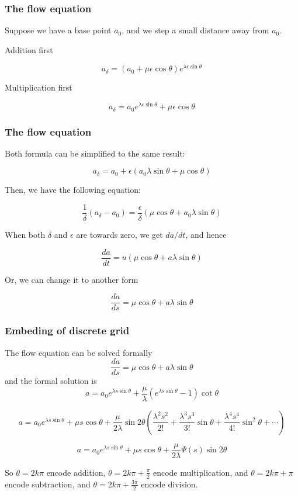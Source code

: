 \documentclass[aspectratio=169]{beamer}
\begin{document}
\begin{frame}
    \frametitle{The flow equation}

    Suppose we have a base point $a_0$, and we step a small distance away from $a_0$.

    Addition first

    \[
        a_{\delta} = (a_0 + \mu \epsilon \cos \theta)e^{\lambda \epsilon \sin \theta}
    \]

    Multiplication first

    \[
        a_{\delta} = a_0 e^{\lambda \epsilon \sin \theta} + \mu \epsilon \cos \theta
    \]

\end{frame}

\begin{frame}
    \frametitle{The flow equation}

    Both formula can be simplified to the same result:

    \[
        a_{\delta} = a_0 + \epsilon (a_0 \lambda \sin \theta + \mu \cos \theta)
    \]

    Then, we have the following equation:

    \[
        \frac{1}{\delta} (a_{\delta} - a_0) = \frac{\epsilon}{\delta} (\mu \cos \theta + a_0 \lambda \sin \theta)
    \]

    When both $\delta$ and $\epsilon$ are towards zero, we get $da / dt$, and hence

    \[
        \frac{da}{dt} = u (\mu \cos \theta + a \lambda \sin \theta)
    \]

    Or, we can change it to another form

    \begin{equation}
        \frac{da}{ds} = \mu \cos \theta + a \lambda \sin \theta\label{eq:flow}
    \end{equation}

\end{frame}

\begin{frame}
    \frametitle{Embeding of discrete grid}
    The flow equation can be solved formally
    \[
        \frac{da}{ds} = \mu \cos \theta + a \lambda \sin \theta
    \]
    and the formal solution is
    \begin{equation}\label{eq:directformalsolution}
    a =  a_0 e^{\lambda s \sin \theta} + \frac{\mu}{\lambda} (e^{\lambda s \sin \theta} - 1) \cot \theta
    \end{equation}

    \[
        a = a_0 e^{\lambda s \sin \theta} + \mu s \cos \theta + \frac{\mu}{2\lambda} \sin 2\theta (\frac{\lambda^2s^2}{2!} + \frac{\lambda^3s^3}{3!} \sin \theta + \frac{\lambda^4s^4}{4!} \sin^2 \theta + \cdots)
    \]

    \[
        a = a_0 e^{\lambda s \sin \theta} + \mu s \cos \theta + \frac{\mu}{2\lambda} \Psi(s) \sin 2\theta
    \]

    So $\theta = 2k\pi$ encode addition, $\theta = 2k\pi + \frac{\pi}{2}$ encode multiplication,
    and $\theta = 2k\pi + \pi$ encode subtraction, and $\theta = 2k\pi + \frac{3\pi}{2}$ encode division.
\end{frame}
\end{document}
